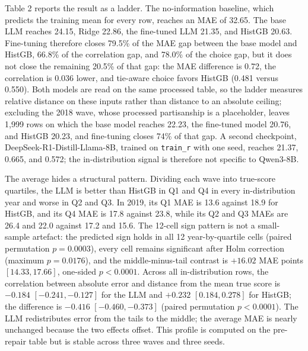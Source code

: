 Table 2 reports the result as a ladder. The no-information baseline,
which predicts the training mean for every row, reaches an MAE of 32.65.
The base LLM reaches 24.15, Ridge 22.86, the fine-tuned LLM 21.35, and
HistGB 20.63. Fine-tuning therefore closes 79.5\% of the MAE gap between
the base model and HistGB, 66.8\% of the correlation gap, and 78.0\% of
the choice gap, but it does not close the remaining 20.5\% of that gap:
the MAE difference is 0.72, the correlation is 0.036 lower, and
tie-aware choice favors HistGB (0.481 versus 0.550). Both models are
read on the same processed table, so the ladder measures relative
distance on these inputs rather than distance to an absolute ceiling;
excluding the 2018 wave, whose processed partisanship is a placeholder,
leaves 1,999 rows on which the base model reaches 22.23, the fine-tuned
model 20.76, and HistGB 20.23, and fine-tuning closes 74\% of that gap.
A second checkpoint, DeepSeek-R1-Distill-Llama-8B, trained on
\texttt{train\_r} with one seed, reaches 21.37, 0.665, and 0.572; the
in-distribution signal is therefore not specific to Qwen3-8B.

The average hides a structural pattern. Dividing each wave into
true-score quartiles, the LLM is better than HistGB in Q1 and Q4 in
every in-distribution year and worse in Q2 and Q3. In 2019, its Q1 MAE
is 13.6 against 18.9 for HistGB, and its Q4 MAE is 17.8 against 23.8,
while its Q2 and Q3 MAEs are 26.4 and 22.0 against 17.2 and 15.6. The
12-cell sign pattern is not a small-sample artefact: the predicted sign
holds in all 12 year-by-quartile cells (paired permutation
\(p=0.0003\)), every cell remains significant after Holm correction
(maximum \(p=0.0176\)), and the middle-minus-tail contrast is \(+16.02\)
MAE points \([14.33, 17.66]\), one-sided \(p<0.0001\). Across all
in-distribution rows, the correlation between absolute error and
distance from the mean true score is \(-0.184\) \([-0.241,-0.127]\) for
the LLM and \(+0.232\) \([0.184,0.278]\) for HistGB; the difference is
\(-0.416\) \([-0.460,-0.373]\) (paired permutation \(p<0.0001\)). The
LLM redistributes error from the tails to the middle; the average MAE is
nearly unchanged because the two effects offset. This profile is
computed on the pre-repair table but is stable across three waves and
three seeds.

